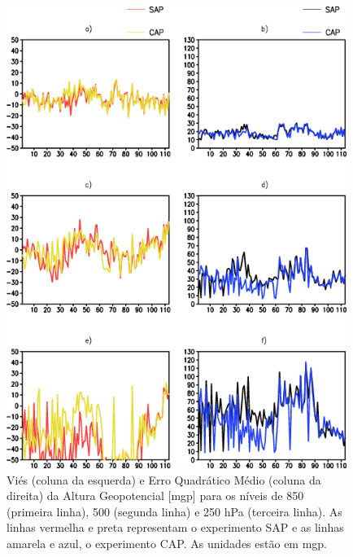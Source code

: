 \begin{figure}[!hbp]
\centering
\includegraphics[height=15cm]{./figs/vies_eqm-zgeo.png}
\caption{Viés (coluna da esquerda) e Erro Quadrático Médio (coluna da direita) da Altura Geopotencial [mgp] para os níveis de 850 (primeira linha), 500 (segunda linha) e 250 hPa (terceira linha). As linhas vermelha e preta representam o experimento SAP e as linhas amarela e azul, o experimento CAP. As unidades estão em mgp.}
\label{fig30a}
\end{figure}

